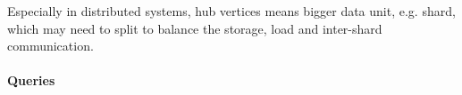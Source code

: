 
Especially in distributed systems, hub vertices means bigger data unit, e.g. shard, which may need to split to balance the storage, load and inter-shard communication.


\paragraph{Queries}
{\raggedright

}